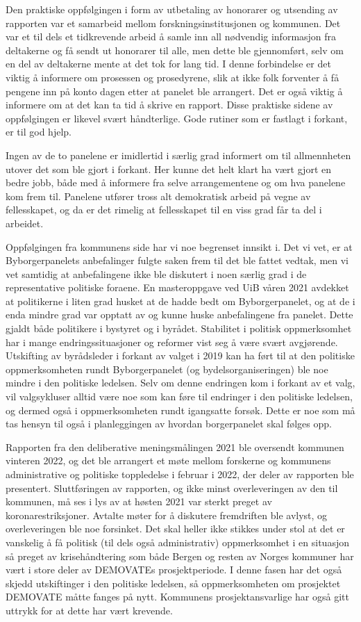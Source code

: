 \documentclass[
  12pt,
  a4paper, 12pt]{article}
\begin{document}
Den praktiske oppfølgingen i form av utbetaling av honorarer og utsending av rapporten var et samarbeid mellom forskningsinstitusjonen og kommunen. Det var et til dels et tidkrevende arbeid å samle inn all nødvendig informasjon fra deltakerne og få sendt ut honorarer til alle, men dette ble gjennomført, selv om en del av deltakerne mente at det tok for lang tid. I denne forbindelse er det viktig å informere om prosessen og prosedyrene, slik at ikke folk forventer å få pengene inn på konto dagen etter at panelet ble arrangert. Det er også viktig å informere om at det kan ta tid å skrive en rapport. Disse praktiske sidene av oppfølgingen er likevel svært håndterlige. Gode rutiner som er fastlagt i forkant, er til god hjelp.

Ingen av de to panelene er imidlertid i særlig grad informert om til allmennheten utover det som ble gjort i forkant. Her kunne det helt klart ha vært gjort en bedre jobb, både med å informere fra selve arrangementene og om hva panelene kom frem til. Panelene utfører tross alt demokratisk arbeid på vegne av fellesskapet, og da er det rimelig at fellesskapet til en viss grad får ta del i arbeidet.

Oppfølgingen fra kommunens side har vi noe begrenset innsikt i. Det vi vet, er at Byborgerpanelets anbefalinger fulgte saken frem til det ble fattet vedtak, men vi vet samtidig at anbefalingene ikke ble diskutert i noen særlig grad i de representative politiske foraene. En masteroppgave ved UiB våren 2021 avdekket at politikerne i liten grad husket at de hadde bedt om Byborgerpanelet, og at de i enda mindre grad var opptatt av og kunne huske anbefalingene fra panelet. Dette gjaldt både politikere i bystyret og i byrådet. Stabilitet i politisk oppmerksomhet har i mange endringssituasjoner og reformer vist seg å være svært avgjørende. Utskifting av byrådsleder i forkant av valget i 2019 kan ha ført til at den politiske oppmerksomheten rundt Byborgerpanelet (og bydelsorganiseringen) ble noe mindre i den politiske ledelsen. Selv om denne endringen kom i forkant av et valg, vil valgsykluser alltid være noe som kan føre til endringer i den politiske ledelsen, og dermed også i oppmerksomheten rundt igangsatte forsøk. Dette er noe som må tas hensyn til også i planleggingen av hvordan borgerpanelet skal følges opp.

Rapporten fra den deliberative meningsmålingen 2021 ble oversendt kommunen vinteren 2022, og det ble arrangert et møte mellom forskerne og kommunens administrative og politiske toppledelse i februar i 2022, der deler av rapporten ble presentert. Sluttføringen av rapporten, og ikke minst overleveringen av den til kommunen, må ses i lys av at høsten 2021 var sterkt preget av koronarestriksjoner. Avtalte møter for å diskutere fremdriften ble avlyst, og overleveringen ble noe forsinket. Det skal heller ikke stikkes under stol at det er vanskelig å få politisk (til dels også administrativ) oppmerksomhet i en situasjon så preget av krisehåndtering som både Bergen og resten av Norges kommuner har vært i store deler av DEMOVATEs prosjektperiode. I denne fasen har det også skjedd utskiftinger i den politiske ledelsen, så oppmerksomheten om prosjektet DEMOVATE måtte fanges på nytt. Kommunens prosjektansvarlige har også gitt uttrykk for at dette har vært krevende.
\end{document}
